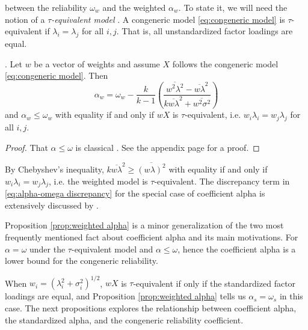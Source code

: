 \documentclass[twoside]{article}
\renewcommand{\sqrt}[1]{{(#1)^{1/2}}}
\begin{document}
between the reliability $\omega_{w}$ and the weighted $\alpha_{w}$. To state it, we will need
the notion of a \emph{$\tau$-equivalent model} \citep[][section 2.13]{Lord1968-ax}. A congeneric model \eqref{eq:congeneric model} is $\tau$-equivalent if $\lambda_{i}=\lambda_{j}$ for all $i,j$. That is, all unstandardized
factor loadings are equal.
\begin{prop}
\label{prop:weighted alpha}. Let $w$ be a vector of weights and
assume $X$ follows the congeneric model \eqref{eq:congeneric model}. Then 
\begin{equation}
\alpha_{w}=\omega_{w}-\frac{k}{k-1}\left(\frac{\overline{w^{2}\lambda^{2}}-\overline{w\lambda}^{2}}{k\overline{w\lambda}^{2}+\overline{w^{2}\sigma^{2}}}\right)\label{eq:alpha-omega discrepancy}
\end{equation}
and $\alpha_w \leq \omega_w$ with equality if and only if $wX$ is $\tau$-equivalent, i.e. $w_i\lambda_{i}=w_j\lambda_{j}$
for all $i,j$.
\end{prop}
\begin{proof}
That  $\alpha \leq \omega$ is classical \citep[][pp. 87 -- 89]{Lord1968-ax}. See the appendix page \pageref{proof:weighted alpha}
for a proof.
\end{proof}

By Chebyshev's inequality, $k\overline{w\lambda}^{2}\geq\overline{(w\lambda)^{2}}$
with equality if and only if $w_{i}\lambda_{i}=w_{j}\lambda_{j}$,
i.e. the weighted model is $\tau$-equivalent. The discrepancy term in \eqref{eq:alpha-omega discrepancy} for the special case of coefficient alpha is extensively discussed by \citet{Raykov1997-bu}. 

Proposition \ref{prop:weighted alpha} is a minor generalization of the two most frequently mentioned fact about coefficient alpha and its main motivations. For $\alpha = \omega$ under the $\tau$-equivalent model and
$\alpha \leq \omega$, hence the coefficient alpha is a lower bound for the congeneric reliability.
 
When $w_{i}=\sqrt{\lambda_{i}^{2}+\sigma_{i}^{2}}$, $wX$ is $\tau$-equivalent if only if the standardized factor loadings are equal, and Proposition \ref{prop:weighted alpha} tells us $\alpha_s = \omega_s$ in this case. 
The next propositions explores the relationship between coefficient alpha, the standardized alpha, and the congeneric reliability coefficient.
\end{document}
